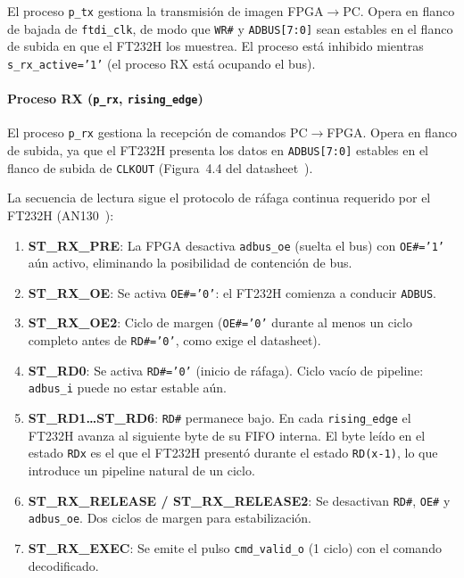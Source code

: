\documentclass[../main.tex]{subfiles}
\begin{document}
El proceso \texttt{p\_tx} gestiona la transmisión de imagen FPGA$\rightarrow$PC. Opera en flanco de bajada de \texttt{ftdi\_clk}, de modo que \texttt{WR\#} y \texttt{ADBUS[7:0]} sean estables en el flanco de subida en que el FT232H los muestrea. El proceso está inhibido mientras \texttt{s\_rx\_active='1'} (el proceso RX está ocupando el bus).

\paragraph{Proceso RX (\texttt{p\_rx}, \texttt{rising\_edge})}

El proceso \texttt{p\_rx} gestiona la recepción de comandos PC$\rightarrow$FPGA. Opera en flanco de subida, ya que el FT232H presenta los datos en \texttt{ADBUS[7:0]} estables en el flanco de subida de \texttt{CLKOUT} (Figura~4.4 del datasheet~\cite{ft232h_datasheet}).

La secuencia de lectura sigue el protocolo de ráfaga continua requerido por el FT232H (AN130~\cite{ft232h_an130}):

\begin{enumerate}
    \item \textbf{ST\_RX\_PRE}: La FPGA desactiva \texttt{adbus\_oe} (suelta el bus) con \texttt{OE\#='1'} aún activo, eliminando la posibilidad de contención de bus.
    \item \textbf{ST\_RX\_OE}: Se activa \texttt{OE\#='0'}: el FT232H comienza a conducir \texttt{ADBUS}.
    \item \textbf{ST\_RX\_OE2}: Ciclo de margen (\texttt{OE\#='0'} durante al menos un ciclo completo antes de \texttt{RD\#='0'}, como exige el datasheet).
    \item \textbf{ST\_RD0}: Se activa \texttt{RD\#='0'} (inicio de ráfaga). Ciclo vacío de pipeline: \texttt{adbus\_i} puede no estar estable aún.
    \item \textbf{ST\_RD1\ldots ST\_RD6}: \texttt{RD\#} permanece bajo. En cada \texttt{rising\_edge} el FT232H avanza al siguiente byte de su FIFO interna. El byte leído en el estado \texttt{RDx} es el que el FT232H presentó durante el estado \texttt{RD(x-1)}, lo que introduce un pipeline natural de un ciclo.
    \item \textbf{ST\_RX\_RELEASE / ST\_RX\_RELEASE2}: Se desactivan \texttt{RD\#}, \texttt{OE\#} y \texttt{adbus\_oe}. Dos ciclos de margen para estabilización.
    \item \textbf{ST\_RX\_EXEC}: Se emite el pulso \texttt{cmd\_valid\_o} (1 ciclo) con el comando decodificado.
\end{enumerate}
\end{document}
